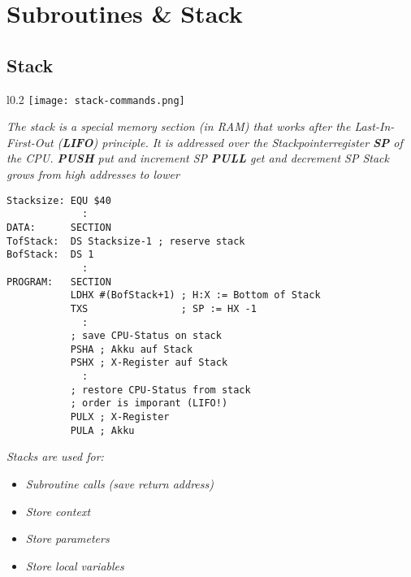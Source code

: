 \section{Subroutines \& Stack}

\subsection{Stack}

\begin{wrapfigure}{l}{0.2\textwidth}
    \centering
    \hspace{-20pt}
    \texttt{[image: stack-commands.png]}
    \hspace{-50pt}
\end{wrapfigure}

\textit{
    The stack is a special memory section (in RAM)
    that works after the Last-In-First-Out (\textbf{LIFO})
    principle.
    \newline
    It is addressed over the Stackpointerregister
    \textbf{SP} of the CPU.
    \newline
    \textbf{PUSH} put and increment SP
    \newline
    \textbf{PULL} get and decrement SP
    \newline
    Stack grows from high addresses to lower
}

\begin{lstlisting}
Stacksize: EQU $40
             :
DATA:      SECTION
TofStack:  DS Stacksize-1 ; reserve stack
BofStack:  DS 1
             :
PROGRAM:   SECTION
           LDHX #(BofStack+1) ; H:X := Bottom of Stack
           TXS                ; SP := HX -1
             :
           ; save CPU-Status on stack
           PSHA ; Akku auf Stack
           PSHX ; X-Register auf Stack
             :
           ; restore CPU-Status from stack
           ; order is imporant (LIFO!)
           PULX ; X-Register
           PULA ; Akku
\end{lstlisting}

\textit{Stacks are used for:}

\begin{itemize}
    \item{\textit{Subroutine calls (save return address)}}
    \item{\textit{Store context}}
    \item{\textit{Store parameters}}
    \item{\textit{Store local variables}}
\end{itemize}

